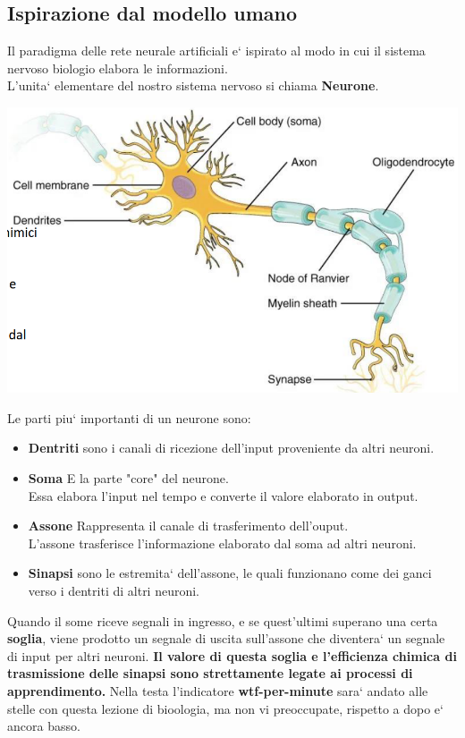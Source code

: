 \subsection{Ispirazione dal modello umano}
Il paradigma delle rete neurale artificiali e` ispirato al modo in cui il sistema 
%
nervoso biologio elabora le informazioni.
\\
L'unita` elementare del nostro sistema nervoso si chiama \textbf{Neurone}.
\begin{center}
    \includegraphics[scale=0.5]{images/Neurone.png}
\end{center}
Le parti piu` importanti di un neurone sono:
\begin{itemize}
    \item \textbf{Dentriti} sono i canali di ricezione dell'input proveniente 
%
    da altri neuroni.
    \item \textbf{Soma} E la parte "core" del neurone.
\\
    Essa elabora l'input nel tempo e converte il valore elaborato in output.
    \item \textbf{Assone} Rappresenta il canale di trasferimento dell'ouput.
\\
    L'assone trasferisce l'informazione elaborato dal soma ad altri neuroni.
    \item \textbf{Sinapsi} sono le estremita` dell'assone, le quali funzionano 
%
    come dei ganci verso i dentriti di altri neuroni.
\end{itemize}
Quando il some riceve segnali in ingresso, e se quest'ultimi superano una certa 
%
\textbf{soglia}, viene prodotto un segnale di uscita sull'assone che diventera`
%
un segnale di input per altri neuroni.
\textbf{Il valore di questa soglia e l'efficienza chimica di trasmissione delle 
%
sinapsi sono strettamente legate ai processi di apprendimento.}
Nella testa l'indicatore \textbf{wtf-per-minute} sara` andato alle stelle con
%
questa lezione di bioologia, ma non vi preoccupate, rispetto a dopo e` ancora basso.
